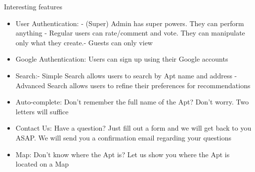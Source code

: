 \documentclass[final]{beamer}
\newlength{\onecolwid}
\newlength{\twocolwid}
\begin{document}
\begin{frame}[t]
\begin{columns}[t]
\begin{column}{\twocolwid}
\begin{columns}[t,totalwidth=\twocolwid]
\begin{column}{\onecolwid}



\end{column} %

\end{columns} %


\begin{alertblock}{Interesting features}

\begin{itemize}
\item User Authentication: \newline- (Super) Admin has super powers. They can perform anything \newline - Regular users can rate/comment and vote. They can manipulate only what they create.\newline  - Guests can only view
\item Google Authentication: Users can sign up using their Google accounts
\item Search:\newline- Simple Search allows users to search by Apt name and address \newline- Advanced Search allows users to refine their preferences for recommendations
\item Auto-complete: Don't remember the full name of the Apt? Don't worry. Two letters will suffice
\item Contact Us: Have a question? Just fill out a form and we will get back to you ASAP. We will send you a confirmation email regarding your questions
\item Map: Don't know where the Apt is? Let us show you where the Apt is located on a Map

\end{itemize}
\end{alertblock} 



\end{column}
\end{columns}
\end{frame}
\end{document}
